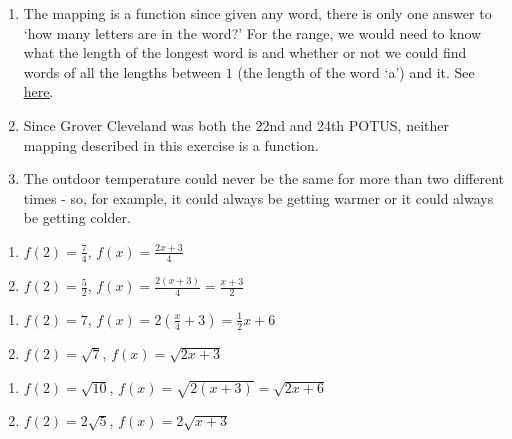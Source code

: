 \documentclass{ximera}
\begin{document}
\begin{enumerate}


\item    The mapping is a function since given any word, there is only one answer to `how many letters are in the word?'  For the range, we would need to know what the length of the longest word is and whether or not we could find words of all the lengths between $1$ (the length of the word `a') and it.  See \href{https://en.wikipedia.org/wiki/Longest_word_in_English}{\underline{here}}.

\item  Since Grover Cleveland was both the 22nd and 24th POTUS, neither mapping described in this exercise is a function.

\item  The outdoor temperature could never be the same for more than two different times - so, for example, it could always be getting warmer or it could always be getting colder.


\end{enumerate}


\begin{enumerate}

\item $f(2) = \frac{7}{4}$, $f(x) = \frac{2x+3}{4}$

\item $f(2) = \frac{5}{2}$, $f(x) = \frac{2(x+3)}{4} = \frac{x+3}{2}$  

\end{enumerate}


\begin{enumerate}

\item $f(2) = 7$, $f(x) = 2\left(\frac{x}{4} + 3\right) = \frac{1}{2} x + 6$   

\item $f(2) = \sqrt{7}$, $f(x) = \sqrt{2x+3}$ 

\end{enumerate}


\begin{enumerate}

\item $f(2) = \sqrt{10}$, $f(x) = \sqrt{2(x+3)} = \sqrt{2x+6}$

\item $f(2) = 2 \sqrt{5}$, $f(x) = 2\sqrt{x+3}$ 

\end{enumerate}
\end{document}
